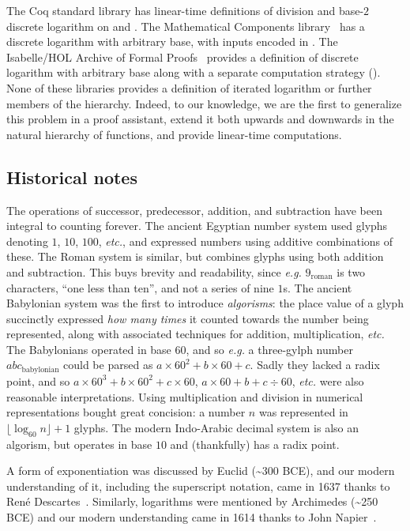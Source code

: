 
%

The Coq standard library has linear-time definitions
of division and base-$2$ discrete logarithm on  and .
The Mathematical Components library~\cite{MathComp}
has a discrete logarithm with arbitrary base, with inputs encoded in .
The Isabelle/HOL Archive of Formal Proofs~\cite{isastan2019} 
provides a definition of discrete logarithm
with arbitrary base along with a separate computation strategy (\lstset{style=isaStyle}\li{[code]}\lstset{style=myStyle}).
None of these libraries provides a definition of iterated logarithm or
further members of the hierarchy.
Indeed, to our knowledge, we are the first to generalize this
problem in a proof assistant, extend it both
upwards and downwards in the natural hierarchy of functions, and
provide linear-time computations.

\subsection{Historical notes}
The operations of successor, predecessor, addition, and subtraction have
been integral to counting forever. The ancient Egyptian
number system used glyphs denoting $1$, $10$, $100$, \emph{etc.},
and expressed numbers using additive combinations of these.
The Roman system is similar, but
combines glyphs using both addition and subtraction.
This buys brevity and readability,
since \emph{e.g.} $9_{\text{roman}}$ is two characters, ``one less than ten'',
and not a series of nine $1$s.
The ancient Babylonian system was the first to introduce 
\emph{algorisms}: the place value of a glyph succinctly expressed \emph{how many times} 
it counted towards the number being represented, along with associated techniques for addition, multiplication, \emph{etc.}
The Babylonians operated in
base $60$, and so \emph{e.g.} a three-gylph number $abc_{\text{babylonian}}$ could
be parsed as $a \times 60^2 + b \times 60 + c$. Sadly they lacked
a radix point, and so
$a \times 60^3 + b \times 60^2 + c \times 60$, $a \times 60 + b + c \div 60$,
\emph{etc.} were also reasonable interpretations.
Using multiplication and division in numerical representations bought great concision: a number $n$ was
represented in $\lfloor \log_{60}n \rfloor + 1$ glyphs.
The modern Indo-Arabic decimal system is also an algorism, 
but operates in base $10$ and (thankfully) has a radix point.

A form of exponentiation was discussed by Euclid (\textasciitilde 300 BCE), and our modern
understanding of it, including the superscript notation,
came in 1637 thanks to René Descartes~\cite{descartes}. 
Similarly, logarithms were mentioned by 
Archimedes (\textasciitilde 250 BCE) and our modern understanding came in 1614 thanks to 
John Napier~\cite{napier}.

